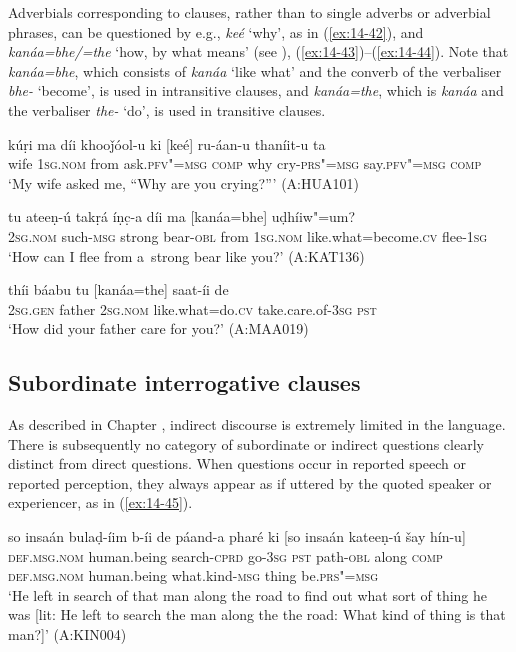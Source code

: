 Adverbials corresponding to clauses, rather than to single adverbs or adverbial phrases, can be questioned by e.g., \textit{keé} `why', as in (\ref{ex:14-42}), and \textit{kanáa=bhe/=the} `how, by what means' (see ), (\ref{ex:14-43})--(\ref{ex:14-44}). Note that \textit{kanáa=bhe}, which consists of \textit{kanáa} `like what' and the converb of the verbaliser \textit{bhe-} `become', is used in intransitive clauses, and \textit{kanáa=the}, which is \textit{kanáa} and the verbaliser \textit{the-} `do', is used in transitive clauses.

\begin{exe}
\ex
\label{ex:14-42}
\gll kúṛi ma díi khooǰóol-u ki [keé] ru-áan-u thaníit-u ta \\
wife \textsc{1sg.nom} from ask.\textsc{pfv"=msg} \textsc{comp} why  cry-\textsc{prs"=msg} say.\textsc{pfv"=msg} \textsc{comp}\\
\glt `My wife asked me, ``Why are you crying?''' (A:HUA101)

\ex
\label{ex:14-43}
\gll tu ateeṇ-ú takṛá íṇc̣-a díi ma [kanáa=bhe] uḍhíiw"=um? \\
\textsc{2sg.nom} such-\textsc{msg} strong bear-\textsc{obl} from \textsc{1sg.nom}  like.what=become.\textsc{cv} flee-\textsc{1sg} \\
\glt `How can I flee from a~strong bear like you?' (A:KAT136)

\ex
\label{ex:14-44}
\gll thíi báabu tu [kanáa=the] saat-íi de \\
\textsc{2sg.gen} father \textsc{2sg.nom} like.what=do.\textsc{cv} take.care.of-\textsc{3sg} \textsc{pst} \\
\glt `How did your father care for you?' (A:MAA019)
\end{exe}

\subsection{Subordinate interrogative clauses}
\label{subsec:14-2-3}


As described in Chapter , indirect discourse is extremely limited in the language. There is subsequently no category of subordinate or indirect questions clearly distinct from direct questions. When questions occur in reported speech or reported perception, they always appear as if uttered by the quoted speaker or experiencer, as in (\ref{ex:14-45}).

\begin{exe}
\ex
\label{ex:14-45}
\gll so insaán bulaḍ-íim b-íi de páand-a pharé ki [so insaán  kateeṇ-ú šay hín-u] \\
\textsc{def.msg.nom} human.being search-\textsc{cprd} go-\textsc{3sg} \textsc{pst} path-\textsc{obl} along \textsc{comp} \textsc{def.msg.nom} human.being what.kind-\textsc{msg} thing be.\textsc{prs"=msg } \\
\glt `He left in search of that man along the road to find out what sort of thing he was [lit: He left to search the man along the the road: What kind of thing is that man?]' (A:KIN004)
\end{exe}


